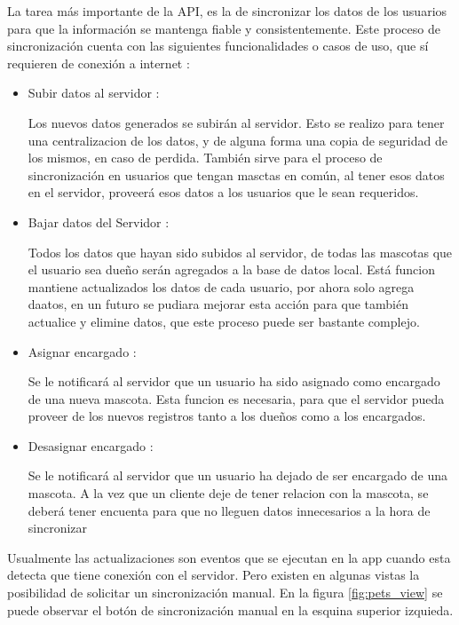 La tarea más importante de la API, es la de sincronizar los datos de los usuarios para que la información se mantenga fiable y consistentemente. Este proceso de sincronización cuenta con las siguientes funcionalidades o casos de uso, que sí requieren de conexión a internet :
\begin{itemize}
	\item Subir datos al servidor :
	
	Los nuevos datos generados se subirán al servidor. Esto se realizo para tener una centralizacion de los datos, y de alguna forma una copia de seguridad de los mismos, en caso de perdida. También sirve para el proceso de sincronización en usuarios que tengan masctas en común, al tener esos datos en el servidor, proveerá esos datos a los usuarios que le sean requeridos.
	
	\item Bajar datos del Servidor :
	
	Todos los datos que hayan sido subidos al servidor, de todas las mascotas que el usuario sea dueño serán agregados a la base de datos local. Está funcion mantiene actualizados los datos de cada usuario, por ahora solo agrega daatos, en un futuro se pudiara mejorar esta acción para que también actualice y elimine datos, que este proceso puede ser bastante complejo. 
	
	\item Asignar encargado :
	
	Se le notificará al servidor que un usuario ha sido asignado como encargado de una nueva mascota. Esta funcion es necesaria, para que el servidor pueda proveer de los nuevos registros tanto a los dueños como a los encargados.
	
		\item Desasignar encargado :
	
	Se le notificará al servidor que un usuario ha dejado de ser  encargado de una mascota. A la vez que un cliente deje de tener relacion con la mascota, se deberá tener encuenta para que no lleguen datos innecesarios a la hora de sincronizar   
\end{itemize}
Usualmente las actualizaciones son eventos que se ejecutan en la app cuando esta detecta que tiene conexión con el servidor. Pero existen en algunas vistas la posibilidad de solicitar un sincronización manual. En la figura \ref{fig:pets_view} se puede observar el botón de sincronización manual en la esquina superior izquieda.
